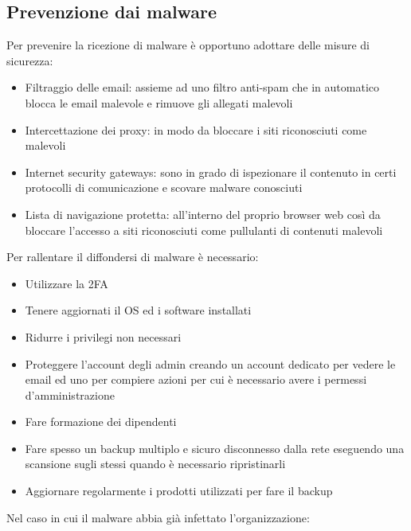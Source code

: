 \subsection{Prevenzione dai malware}
Per prevenire la ricezione di malware è opportuno adottare delle misure di sicurezza:
\begin{itemize}[noitemsep]
    \item Filtraggio delle email: assieme ad uno filtro anti-spam che in automatico blocca le email malevole e rimuove gli allegati malevoli
    \item Intercettazione dei proxy: in modo da bloccare i siti riconosciuti come malevoli
    \item Internet security gateways: sono in grado di ispezionare il contenuto in certi protocolli di comunicazione e scovare malware conosciuti
    \item Lista di navigazione protetta: all'interno del proprio browser web così da bloccare l'accesso a siti riconosciuti come pullulanti di contenuti malevoli
\end{itemize}
Per rallentare il diffondersi di malware è necessario:
\begin{itemize}[noitemsep]
    \item Utilizzare la \acrshort{2FA}
    \item Tenere aggiornati il \acrshort{OS} ed i software installati
    \item Ridurre i privilegi non necessari
    \item Proteggere l'account degli admin creando un account dedicato per vedere le email ed uno per compiere azioni per cui è necessario avere i permessi d'amministrazione
    \item Fare formazione dei dipendenti
    \item Fare spesso un backup multiplo e sicuro disconnesso dalla rete eseguendo una scansione sugli stessi quando è necessario ripristinarli
    \item Aggiornare regolarmente i prodotti utilizzati per fare il backup
\end{itemize}
Nel caso in cui il malware abbia già infettato l'organizzazione:
